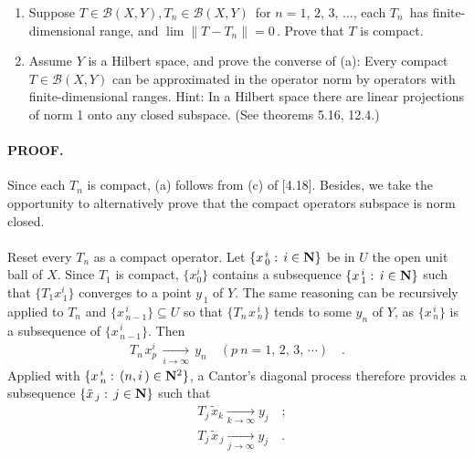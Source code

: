 { \CMUCS 
\begin{enumerate}
\renewcommand{\labelenumi}{(\alph{enumi})}
\item Suppose $T\in \mathscr{B}(X,Y), T_n \in  \mathscr{B}(X,Y)\, $ for $n=1,\, 2, \, 3,\, \dots$, each $T_n\,$ has finite-dimensional range, and $\lim \| T-T_n\|=0\, $. Prove that $T$ is compact.
\item Assume $Y$ is a Hilbert space, and prove the converse of (a): Every compact $T\in  \mathscr{B}(X,Y)$ can be approximated in the operator norm by operators with finite-dimensional ranges. Hint: In a Hilbert space there are linear projections of norm 1 onto any closed subspace. (See theorems 5.16, 12.4.)
\end{enumerate}
}
\paragraph{PROOF.} Since each $T_n$ is compact, (a) follows from (c) of [4.18]. Besides, we take the opportunity to alternatively prove that the compact operators subspace is norm closed.\\
\\
Reset every $T_n$ as a compact operator. Let $\{x_{\,0}^{\,i}:\, i\in {\mathbf N}\}$ be in $U$ the open unit ball of $X$. Since $T_1$ is compact, $\{x^i_0\}$ contains a subsequence $\{x^{\,i}_{\,1}:\, i\in {\mathbf N}\}$ such that $\{T_1x^{i}_{\,1}\}$ converges to a point $y_{\,1}$ of $Y$. The same reasoning can be recursively applied to $T_{n}$ and $\{x^{\,i}_{\, n-1}\}\subseteq U$ so that $\{T_{n\,}x^{\,i}_{\, n}\}$ tends to some $y_{n}$ of $Y$, as $\{x^{\,i}_{\, n}\}$ is a subsequence of $\{x^{\,i}_{\,n-1}\}$. Then
\begin{align}\label{4_13_a_0}
T_{n\,} x^{i}_p \,\underset{i\to \infty}{\longrightarrow}\,y_n\quad (p\> n=1,\, 2,\, 3,\, \dotsb )\quad .
\end{align}
Applied with $\{x^{\,i}_{\,n}:\, (n,i\,)\in{\mathbf N}^2\}$, a Cantor's diagonal process therefore provides a subsequence $\{\tilde{x}_{\, j}:\, j\in {\mathbf N}\} $ such that
\begin{align}\label{4_13_a_1}
&T_{j\,} \tilde{x}_k \underset{k\to \infty}{\longrightarrow}y_{j}\quad ;\\
&T_{j\,} \tilde{x}_{\, j} \underset{j\to \infty}{\longrightarrow} y_{j}\quad .
\end{align}
